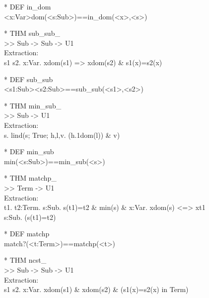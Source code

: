 \begin{prl*}
\>* DEF in\_dom\\
\>  <x:Var>\mepsilon{}dom(<s:Sub>)==in\_dom(<x>,<s>)
\end{prl*}

\begin{prl*}
\>* THM sub\_sub\_\\
\>  >> Sub -> Sub -> U1\\
\>  Extraction:\\
\>  \mlambda{} s1 s2. \mforall{}x:Var. x\mepsilon{}dom(s1) => x\mepsilon{}dom(s2) \& s1(x)=s2(x)
\end{prl*}

\begin{prl*}
\>* DEF sub\_sub\\
\>  <s1:Sub>\msubset{}<s2:Sub>==sub\_sub(<s1>,<s2>)
\end{prl*}

\begin{prl*}
\>* THM min\_sub\_\\
\>  >> Sub -> U1\\
\>  Extraction:\\
\>  \mlambda{}s. lind(s; True; h,l,v. \mneg{}(h.1\mepsilon{}dom(l)) \& v)
\end{prl*}

\begin{prl*}
\>* DEF min\_sub\\
\>  min(<s:Sub>)==min\_sub(<s>)
\end{prl*}

\begin{prl*}
\>* THM matchp\_\\
\>  >> Term -> U1\\
\>  Extraction:\\
\>  \mlambda{}t1. \mforall{}t2:Term. \mexists{}s:Sub. s(t1)=t2 \& min(s) \& \mforall{}x:Var. x\mepsilon{}dom(s) <=> x\mepsilon{}t1\\
\>                  \mvee{} \mforall{}s:Sub. \mneg{}(s(t1)=t2)
\end{prl*}

\begin{prl*}
\>* DEF matchp\\
\>  match?(<t:Term>)==matchp(<t>)
\end{prl*}

\begin{prl*}
\>* THM ncst\_\\
\>  >> Sub -> Sub -> U1\\
\>  Extraction:\\
\>  \mlambda{} s1 s2. \mexists{}x:Var. x\mepsilon{}dom(s1) \& x\mepsilon{}dom(s2) \& \mneg{}(s1(x)=s2(x) in Term)
\end{prl*}

